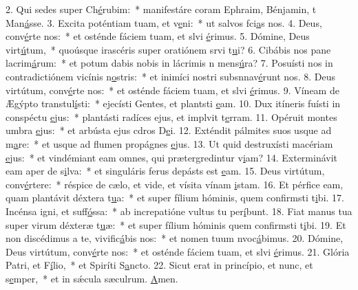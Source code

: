 2. Qui sedes super Ch\uline{é}rubim:~* manifestáre coram Ephraim, Bénjamin, t Man\uline{á}sse.
3. Excita poténtiam tuam, et v\uline{e}ni:~* ut salvos fci\uline{a}s nos.
4. Deus, conv\uline{é}rte nos:~* et osténde fáciem tuam, et slvi \uline{é}rimus.
5. Dómine, Deus virt\uline{ú}tum,~* quoúsque irascéris super oratiónem srvi t\uline{u}i?
6. Cibábis nos pane lacrim\uline{á}rum:~* et potum dabis nobis in lácrimis n mens\uline{ú}ra?
7. Posuísti nos in contradictiónem vicínis n\uline{o}stris:~* et inimíci nostri subsnnav\uline{é}runt nos.
8. Deus virtútum, conv\uline{é}rte nos:~* et osténde fáciem tuam, et slvi \uline{é}rimus.
9. Víneam de Ægýpto transtul\uline{í}sti:~* ejecísti Gentes, et plantsti \uline{e}am.
10. Dux itíneris fuísti in conspéctu \uline{e}jus:~* plantásti radíces ejus, et implvit t\uline{e}rram.
11. Opéruit montes umbra \uline{e}jus:~* et arbústa ejus cdros D\uline{e}i.
12. Exténdit pálmites suos usque ad m\uline{a}re:~* et usque ad flumen propágnes \uline{e}jus.
13. Ut quid destruxísti macériam \uline{e}jus:~* et vindémiant eam omnes, qui prætergredintur v\uline{i}am?
14. Exterminávit eam aper de s\uline{i}lva:~* et singuláris ferus depásts est \uline{e}am.
15. Deus virtútum, conv\uline{é}rtere:~* réspice de cælo, et vide, et vísita vínam \uline{i}stam.
16. Et pérfice eam, quam plantávit déxtera t\uline{u}a:~* et super fílium hóminis, quem confirmsti t\uline{i}bi.
17. Incénsa igni, et suff\uline{ó}ssa:~* ab increpatióne vultus tu per\uline{í}bunt.
18. Fiat manus tua super virum déxteræ t\uline{u}æ:~* et super fílium hóminis quem confirmsti t\uline{i}bi.
19. Et non discédimus a te, vivific\uline{á}bis nos:~* et nomen tuum nvoc\uline{á}bimus.
20. Dómine, Deus virtútum, conv\uline{é}rte nos:~* et osténde fáciem tuam, et slvi \uline{é}rimus.
21. Glória Patri, et F\uline{í}lio,~* et Spiríti S\uline{a}ncto.
22. Sicut erat in princípio, et nunc, et s\uline{e}mper,~* et in sǽcula sæculrum. \uline{A}men.
